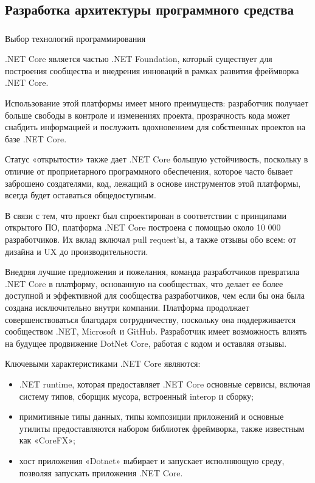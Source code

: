 \subsection{Разработка архитектуры программного средства}
\label{sec:design:architecture}

\subsubsection{} Выбор технологий программирования
\label{sec:design:architecture:language}

.NET Core является частью .NET Foundation, который существует для построения сообщества и внедрения инноваций в рамках развития фреймворка .NET Core.

Использование этой платформы имеет много преимуществ: разработчик получает больше свободы в контроле и изменениях проекта, прозрачность кода может снабдить информацией и послужить вдохновением для собственных проектов на базе .NET Core.

Статус «открытости» также дает .NET Core большую устойчивость, поскольку в отличие от проприетарного программного обеспечения, которое часто бывает заброшено создателями, код, лежащий в основе инструментов этой платформы, всегда будет оставаться общедоступным.

В связи с тем, что проект был спроектирован в соответствии с принципами открытого ПО, платформа .NET Core построена с помощью около 10 000 разработчиков. Их вклад включал pull request’ы, а также отзывы обо всем: от дизайна и UX до производительности.

Внедряя лучшие предложения и пожелания, команда разработчиков превратила .NET Core в платформу, основанную на сообществах, что делает ее более доступной и эффективной для сообщества разработчиков, чем если бы она была создана исключительно внутри компании. Платформа продолжает совершенствоваться благодаря сотрудничеству, поскольку она поддерживается сообществом .NET, Microsoft и GitHub. Разработчик имеет возможность влиять на будущее продвижение DotNet Core, работая с кодом и оставляя отзывы.

Ключевыми характеристиками .NET Core являются:

\begin{itemize}
	\item .NET runtime, которая предоставляет .NET Core основные сервисы, включая систему типов, сборщик мусора, встроенный interop и сборку;
	\item примитивные типы данных, типы композиции приложений и основные утилиты предоставляются набором библиотек фреймворка, также известным как «CoreFX»;
	\item хост приложения «Dotnet» выбирает и запускает исполняющую среду, позволяя запускать приложения .NET Core.
\end{itemize}

